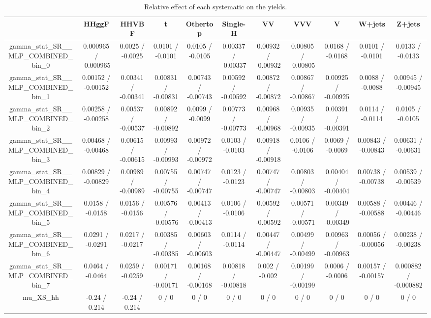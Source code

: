 \documentclass[10pt]{article}
\begin{document}
\begin{table}[htbp]
\begin{center}
\begin{tabular}{|c|c|c|c|c|c|c|c|c|c|c|}
\hline 
      & HHggF      & HHVBF      & t      & Othertop      & Single-H      & VV      & VVV      & V      & W+jets      & Z+jets \\ 
\hline 
  gamma_stat_SR__MLP_COMBINED_bin_0 & 0.000965 / -0.000965 & 0.0025 / -0.0025 & 0.0101 / -0.0101 & 0.0105 / -0.0105 & 0.00337 / -0.00337 & 0.00932 / -0.00932 & 0.00805 / -0.00805 & 0.0168 / -0.0168 & 0.0101 / -0.0101 & 0.0133 / -0.0133 \\ 
  gamma_stat_SR__MLP_COMBINED_bin_1 & 0.00152 / -0.00152 & 0.00341 / -0.00341 & 0.00831 / -0.00831 & 0.00743 / -0.00743 & 0.00592 / -0.00592 & 0.00872 / -0.00872 & 0.00867 / -0.00867 & 0.00925 / -0.00925 & 0.0088 / -0.0088 & 0.00945 / -0.00945 \\ 
  gamma_stat_SR__MLP_COMBINED_bin_2 & 0.00258 / -0.00258 & 0.00537 / -0.00537 & 0.00892 / -0.00892 & 0.0099 / -0.0099 & 0.00773 / -0.00773 & 0.00968 / -0.00968 & 0.00935 / -0.00935 & 0.00391 / -0.00391 & 0.0114 / -0.0114 & 0.0105 / -0.0105 \\ 
  gamma_stat_SR__MLP_COMBINED_bin_3 & 0.00468 / -0.00468 & 0.00615 / -0.00615 & 0.00993 / -0.00993 & 0.00972 / -0.00972 & 0.0103 / -0.0103 & 0.00918 / -0.00918 & 0.0106 / -0.0106 & 0.0069 / -0.0069 & 0.00843 / -0.00843 & 0.00631 / -0.00631 \\ 
  gamma_stat_SR__MLP_COMBINED_bin_4 & 0.00829 / -0.00829 & 0.00989 / -0.00989 & 0.00755 / -0.00755 & 0.00747 / -0.00747 & 0.0123 / -0.0123 & 0.00747 / -0.00747 & 0.00803 / -0.00803 & 0.00404 / -0.00404 & 0.00738 / -0.00738 & 0.00539 / -0.00539 \\ 
  gamma_stat_SR__MLP_COMBINED_bin_5 & 0.0158 / -0.0158 & 0.0156 / -0.0156 & 0.00576 / -0.00576 & 0.00413 / -0.00413 & 0.0106 / -0.0106 & 0.00592 / -0.00592 & 0.00571 / -0.00571 & 0.00349 / -0.00349 & 0.00588 / -0.00588 & 0.00446 / -0.00446 \\ 
  gamma_stat_SR__MLP_COMBINED_bin_6 & 0.0291 / -0.0291 & 0.0217 / -0.0217 & 0.00385 / -0.00385 & 0.00603 / -0.00603 & 0.0114 / -0.0114 & 0.00447 / -0.00447 & 0.00499 / -0.00499 & 0.00963 / -0.00963 & 0.00056 / -0.00056 & 0.00238 / -0.00238 \\ 
  gamma_stat_SR__MLP_COMBINED_bin_7 & 0.0464 / -0.0464 & 0.0259 / -0.0259 & 0.00171 / -0.00171 & 0.00168 / -0.00168 & 0.00818 / -0.00818 & 0.002 / -0.002 & 0.00199 / -0.00199 & 0.0006 / -0.0006 & 0.00157 / -0.00157 & 0.000882 / -0.000882 \\ 
  mu_XS_hh & -0.24 / 0.214 & -0.24 / 0.214 & 0 / 0 & 0 / 0 & 0 / 0 & 0 / 0 & 0 / 0 & 0 / 0 & 0 / 0 & 0 / 0 \\ 
\hline 
\end{tabular} 
\caption{Relative effect of each systematic on the yields.} 
\end{center} 
\end{table} 
\end{document}
